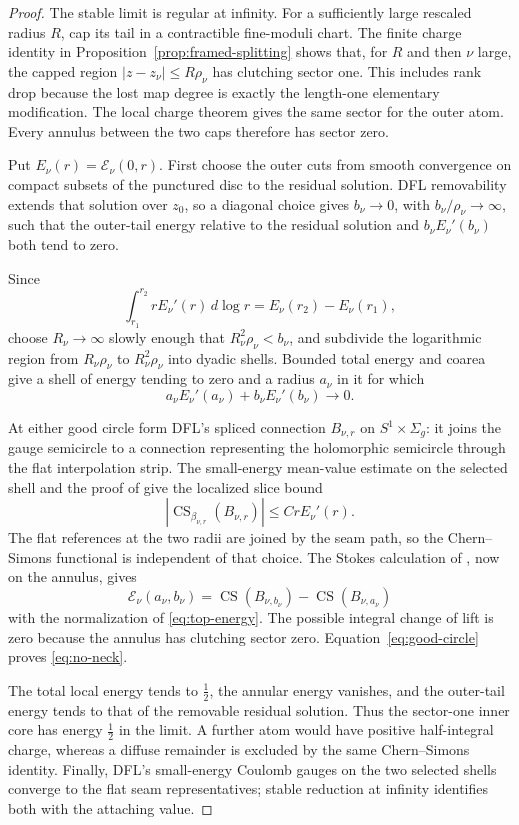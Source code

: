 \documentclass[11pt]{amsart}
\theoremstyle{definition}
\theoremstyle{remark}
\theoremstyle{plain}
\newcommand{\cE}{\mathcal{E}}
\newcommand{\CS}{\operatorname{CS}}
\begin{document}
\begin{proof}
The stable limit is regular at infinity.  For a sufficiently large
rescaled radius $R$, cap its tail in a contractible fine-moduli chart.
The finite charge identity in Proposition~\ref{prop:framed-splitting}
shows that, for $R$ and then $\nu$
large, the capped region $|z-z_\nu|\leq R\rho_\nu$ has clutching sector
one.  This includes rank drop because the lost map degree is exactly the
length-one elementary modification.  The local charge theorem gives the
same sector for the outer atom.  Every annulus between the two caps
therefore has sector zero.

Put $E_\nu(r)=\cE_\nu(0,r)$.  First choose the outer cuts from smooth
convergence on compact subsets of the punctured disc to the residual
solution.  DFL removability extends that solution over $z_0$, so a
diagonal choice gives $b_\nu\to0$, with
$b_\nu/\rho_\nu\to\infty$, such that the outer-tail energy relative to
the residual solution and $b_\nu E_\nu'(b_\nu)$ both tend to zero.

Since
\[
 \int_{r_1}^{r_2}rE_\nu'(r)\,d\log r
       =E_\nu(r_2)-E_\nu(r_1),
\]
choose $R_\nu\to\infty$ slowly enough that
$R_\nu^2\rho_\nu<b_\nu$, and subdivide the logarithmic region from
$R_\nu\rho_\nu$ to $R_\nu^2\rho_\nu$ into dyadic shells.  Bounded total
energy and coarea give a shell of energy tending to zero and a radius
$a_\nu$ in it for which
\begin{equation}\label{eq:good-circle}
 a_\nu E_\nu'(a_\nu)+b_\nu E_\nu'(b_\nu)\longrightarrow0.
\end{equation}

At either good circle form DFL's spliced connection $B_{\nu,r}$ on
$S^1\times\Sigma_g$: it joins the gauge semicircle to a connection
representing the holomorphic semicircle through the flat interpolation
strip.  The small-energy mean-value estimate on the selected shell and
the proof of \cite[Lemma~4.62]{DaeFukLip21b} give the localized slice bound
\[
 |\CS_{\beta_{\nu,r}}(B_{\nu,r})|
             \leq C rE_\nu'(r).
\]
The flat references at the two radii are joined by the seam path, so the
Chern--Simons functional is independent of that choice.  The Stokes
calculation of \cite[Lemma~4.67]{DaeFukLip21b}, now on the annulus, gives
\[
 \cE_\nu(a_\nu,b_\nu)
 =\CS(B_{\nu,b_\nu})-\CS(B_{\nu,a_\nu})
\]
with the normalization of \eqref{eq:top-energy}.  The possible integral
change of lift is zero because the annulus has clutching sector zero.
Equation~\eqref{eq:good-circle} proves \eqref{eq:no-neck}.

The total local energy tends to $\frac12$, the annular energy vanishes,
and the outer-tail energy tends to that of the removable residual
solution.  Thus the sector-one inner core has energy $\frac12$ in the
limit.  A further atom would have positive
half-integral charge, whereas a diffuse remainder is excluded by the
same Chern--Simons identity.  Finally, DFL's small-energy Coulomb gauges
on the two selected shells converge to the flat seam representatives;
stable reduction at infinity identifies both with the attaching value.
\end{proof}
\end{document}
